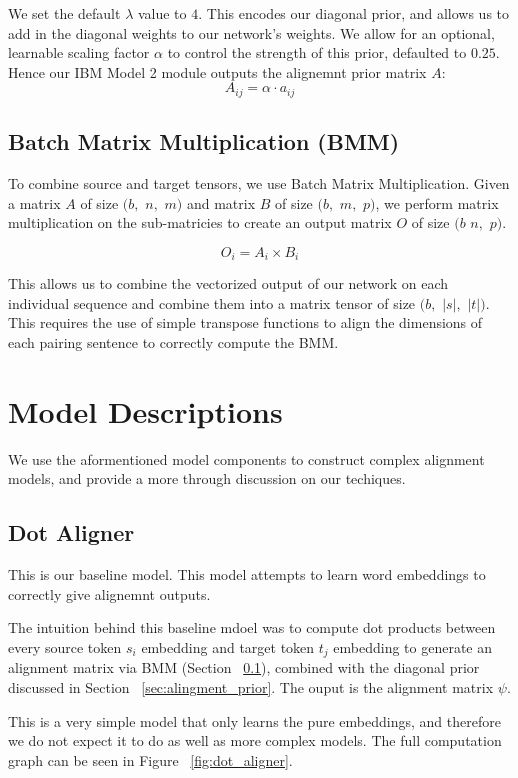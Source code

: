 \documentclass[twoside,twocolumn]{article}
\begin{document}
We set the default $\lambda$ value to $4$. This encodes our diagonal prior, and allows us to add in the diagonal weights to our network's weights. We allow for an optional, learnable scaling factor $\alpha$ to control the strength of this prior, defaulted to $0.25$. Hence our IBM Model 2 module outputs the alignemnt prior matrix $A$:
\begin{equation}
  A_{ij} = \alpha \cdot a_{ij}
\end{equation}

\subsection{Batch Matrix Multiplication (BMM)}
\label{sec:bmm}
To combine source and target tensors, we use Batch Matrix Multiplication. Given a matrix $A$ of size $(b,$ $n,$ $m)$ and matrix $B$ of size $(b,$ $m,$ $p)$, we perform matrix multiplication on the sub-matricies to create an output matrix $O$ of size $(b$ $n,$ $p)$.

\begin{equation}
  O_i = A_i \times B_i
\end{equation}

This allows us to combine the vectorized output of our network on each individual sequence and combine them into a matrix tensor of size $(b,$ $|s|,$ $|t|)$. This requires the use of simple transpose functions to align the dimensions of each pairing sentence to correctly compute the BMM.

\section{Model Descriptions}
We use the aformentioned model components to construct complex alignment models, and provide a more through discussion on our techiques.
\subsection{Dot Aligner}
This is our baseline model. This model attempts to learn word embeddings to correctly give alignemnt outputs.

The intuition behind this baseline mdoel was to compute dot products between every source token $s_i$ embedding and target token $t_j$ embedding to generate an alignment matrix via BMM (Section ~\ref{sec:bmm}), combined with the diagonal prior discussed in Section ~\ref{sec:alingment_prior}. The ouput is the alignment matrix $\psi$.

This is a very simple model that only learns the pure embeddings, and therefore we do not expect it to do as well as more complex models. The full computation graph can be seen in Figure ~\ref{fig:dot_aligner}.
\end{document}
